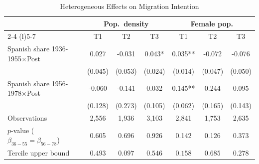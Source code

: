 \begin{table}[!h]
\centering
\renewcommand{\arraystretch}{1.15}
\setlength{\tabcolsep}{6pt}
\captionsetup{justification=centering}
\caption{Heterogeneous Effects on Migration Intention}
\begin{tabular*}{\textwidth}{l@{\extracolsep{\fill}}cccccc}
\hline
& \multicolumn{3}{c}{Pop.\ density} & \multicolumn{3}{c}{Female pop.} \\
\cmidrule(l){2-4} \cmidrule(l){5-7}
& T1 & T2 & T3 & T1 & T2 & T3 \\
\hline
Spanish share 1936-1955$\times$Post & 0.027 & -0.031 & 0.043* & 0.035** & -0.072 & -0.076 \\
 & (0.045) & (0.053) & (0.024) & (0.014) & (0.047) & (0.050) \\
Spanish share 1956-1978$\times$Post & -0.060 & -0.141 & 0.032 & 0.145** & 0.244 & 0.095 \\
  & (0.128) & (0.273) & (0.105) & (0.062) & (0.165) & (0.143) \\
\addlinespace
Observations & 2,556 & 1,936 & 3,103 & 2,841 & 1,753 & 2,635 \\
$p$-value ($\beta_{36{-}55} = \beta_{56{-}78}$) & 0.605 & 0.696 & 0.926 & 0.142 & 0.126 & 0.373 \\
Tercile upper bound & $0.493$ & $0.097$ & $0.546$ & $0.158$ & $0.685$ & $0.278$ \\
\hline
\end{tabular*}
\addvspace{0.2em}
\captionsetup{font=footnotesize, justification=justified, singlelinecheck=false}

\end{table}
